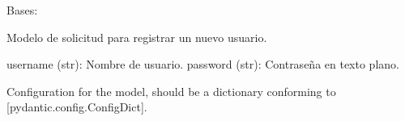 \documentclass[letterpaper,10pt,spanish]{sphinxmanual}
\begin{document}
\begin{fulllineitems}
\label{\detokenize{modelos:main.UsuarioRegistro}}
\pysigstartsignatures
\pysiglinewithargsret
{}
{\sphinxparamcomma {}\sphinxparamcomma {}}
{}
\pysigstopsignatures
\sphinxAtStartPar
Bases: 

\sphinxAtStartPar
Modelo de solicitud para registrar un nuevo usuario.
\begin{description}
\sphinxAtStartPar
username (str): Nombre de usuario.
password (str): Contraseña en texto plano.

\end{description}

\begin{fulllineitems}
\label{\detokenize{modelos:main.UsuarioRegistro.model_config}}
\pysigstartsignatures
\pysigline
{}
\pysigstopsignatures
\sphinxAtStartPar
Configuration for the model, should be a dictionary conforming to {[}\sphinxtitleref{ConfigDict}{]}{[}pydantic.config.ConfigDict{]}.

\end{fulllineitems}


\end{fulllineitems}

\end{document}
